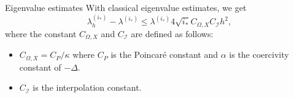 \documentclass[]{beamer}
\newcommand{\oxarrow}{\color{oxfordblue}$\blacktriangleright$}
\begin{document}
	\begin{frame}{Eigenvalue estimates}
	\vspace{1cm}
	With classical eigenvalue estimates, we get 
	\begin{equation*}
		\lambda_h^{(i_{\ast})} - \lambda^{(i_{\ast})} \le \lambda^{(i_\ast)} 4 \sqrt{i_\ast} C_{\Omega,X} C_{\mathcal{I}} h^2,
	\end{equation*}
	where the constant $C_{\Omega,X}$ and $C_{\mathcal{I}}$ are defined as follows:
	\begin{itemize}
		\item<2->[\oxarrow] $C_{\Omega,X} = C_P/\kappa$ where $C_P$ is the Poincaré constant and $\alpha$ is the coercivity constant of $-\Delta$.
		\item<3->[\oxarrow] $C_{\mathcal{I}}$ is the interpolation constant. 
	\end{itemize}
	\end{frame}
\end{document}
